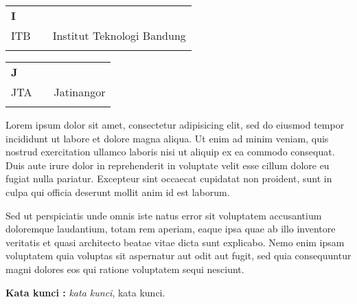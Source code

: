 \documentclass{laporanITB}
\begin{document}
\cover

\tableofcontents
{}
\listoftables
{}
\listoffigures
{}

\singkatan
\noindent

\begin{tabular}{p{20pt}p{3pt}l}
\textbf{I}\\
ITB & & Institut Teknologi Bandung\\
\\
\end{tabular}

\begin{tabular}{p{20pt}p{3pt}l}
\textbf{J}\\
JTA & & Jatinangor\\
\\
\end{tabular}

\begin{abstractind}
Lorem ipsum dolor sit amet, consectetur adipisicing elit, sed do eiusmod tempor incididunt ut labore et dolore magna aliqua. Ut enim ad minim veniam, quis nostrud exercitation ullamco laboris nisi ut aliquip ex ea commodo consequat. Duis aute irure dolor in reprehenderit in voluptate velit esse cillum dolore eu fugiat nulla pariatur. Excepteur sint occaecat cupidatat non proident, sunt in culpa qui officia deserunt mollit anim id est laborum.

Sed ut perspiciatis unde omnis iste natus error sit voluptatem accusantium doloremque laudantium, totam rem aperiam, eaque ipsa quae ab illo inventore veritatis et quasi architecto beatae vitae dicta sunt explicabo. Nemo enim ipsam voluptatem quia voluptas sit aspernatur aut odit aut fugit, sed quia consequuntur magni dolores eos qui ratione voluptatem sequi nesciunt.


\bigskip
\noindent
\textbf{Kata kunci :} \emph{kata kunci}, kata kunci.
\end{abstractind}
\end{document}
